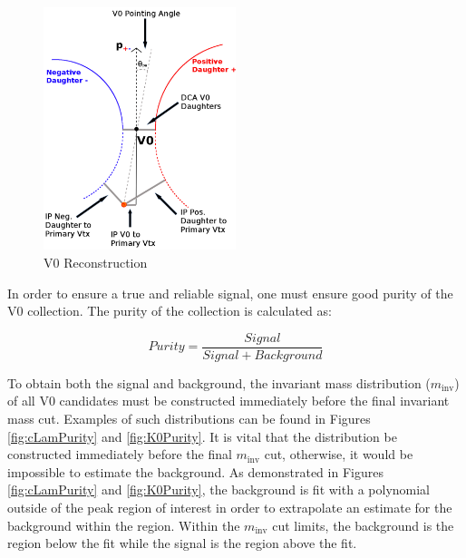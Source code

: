 \documentclass[/home/jesse/Analysis/FemtoAnalysis/AnalysisNotes/AnalysisNoteJBuxton.tex]{subfiles}
\begin{document}
\begin{figure}[h]
  \centering
  \includegraphics[width=0.5\textwidth]{3_DataSelection/Figures/V0CutsGeneral.pdf}
  \caption[V0 Reconstruction]{V0 Reconstruction}
  \label{fig:V0Reconstruction}
\end{figure}


In order to ensure a true and reliable signal, one must ensure good purity of the V0 collection.  The purity of the collection is calculated as:

\begin{equation}
 Purity = \frac{Signal}{Signal + Background}
\label{eqn:Purity}
\end{equation}

To obtain both the signal and background, the invariant mass distribution ($m_{\mathrm{inv}}$) of all V0 candidates must be constructed immediately before the final invariant mass cut.
Examples of such distributions can be found in Figures \ref{fig:cLamPurity} and \ref{fig:K0Purity}.
It is vital that the distribution be constructed immediately before the final $m_{\mathrm{inv}}$ cut, otherwise, it would be impossible to estimate the background.
As demonstrated in Figures \ref{fig:cLamPurity} and \ref{fig:K0Purity}, the background is fit with a polynomial outside of the peak region of interest in order to extrapolate an estimate for the background within the region.
Within the $m_{\mathrm{inv}}$ cut limits, the background is the region below the fit while the signal is the region above the fit.




\end{document}
